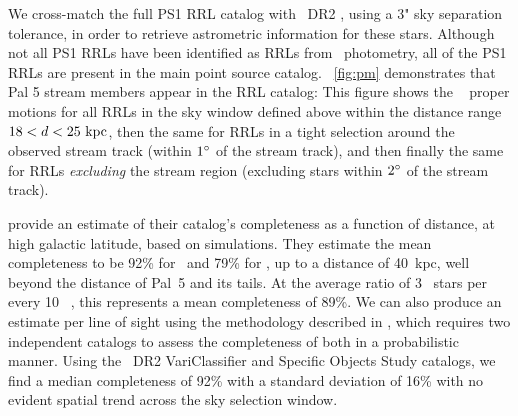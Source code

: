 \documentclass[twocolumn]{aastex63}
\newcommand{\sa}[1]{{\color{teal} SP: #1}}
\begin{document}
We cross-match the full PS1 RRL catalog with \Gaia~DR2 \citep{Gaia:2018}, using a 3" sky separation tolerance, in order to retrieve astrometric information for these stars.
Although not all PS1 RRLs have been identified as RRLs from \Gaia\ photometry, all of the PS1 RRLs are present in the main point source catalog.
\figurename~\ref{fig:pm} demonstrates that Pal 5 stream members appear in the RRL catalog: This figure shows the \Gaia\  proper motions for all RRLs in the sky window defined above within the distance range $18 < d < 25~\mathrm{kpc}$, then the same for RRLs in a tight selection around the observed stream track (within $1\mbox{$^\circ$}$ of the stream track), and then finally the same for RRLs \emph{excluding} the stream region (excluding stars within $2\mbox{$^\circ$}$ of the stream track).

\citet{Sesar:2017b} provide an estimate of their catalog's completeness as a function of distance, at high galactic latitude, based on simulations. They estimate the mean completeness to be 92\% for \rrab~and 79\% for \rrc, up to a distance of 40~kpc, well beyond the distance of Pal~5 and its tails. At the average ratio of 3 \rrc~stars per every 10 \rrab~\citep{Layden1995}, this represents a mean completeness of 89\%. We can also produce an estimate per line of sight using the methodology described in \citet{Rybizki2018}, which requires two independent catalogs to assess the completeness of both in a probabilistic manner. Using the \Gaia~DR2 VariClassifier \citet{Holl2018,Rimoldini2018} and Specific Objects Study \citep{Clementini2018} catalogs, we find a median completeness of 92\% with a standard deviation of 16\% with no evident spatial trend across the sky selection window.

\end{document}
